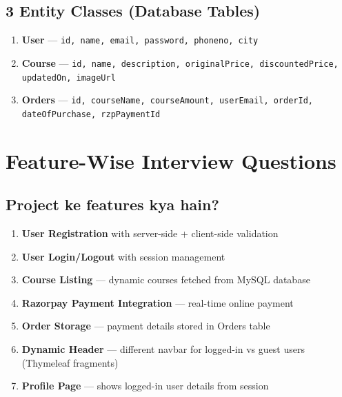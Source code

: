 \documentclass[12pt,a4paper]{article}
\begin{document}
\subsection*{3 Entity Classes (Database Tables)}

\begin{enumerate}
    \item \textbf{User} --- \texttt{id, name, email, password, phoneno, city}
    \item \textbf{Course} --- \texttt{id, name, description, originalPrice, discountedPrice, updatedOn, imageUrl}
    \item \textbf{Orders} --- \texttt{id, courseName, courseAmount, userEmail, orderId, dateOfPurchase, rzpPaymentId}
\end{enumerate}

\section{Feature-Wise Interview Questions}

\setcounter{subsection}{0}

\subsection{Project ke features kya hain?}

\begin{answerbox}
\begin{enumerate}
    \item \textbf{User Registration} with server-side + client-side validation
    \item \textbf{User Login/Logout} with session management
    \item \textbf{Course Listing} --- dynamic courses fetched from MySQL database
    \item \textbf{Razorpay Payment Integration} --- real-time online payment
    \item \textbf{Order Storage} --- payment details stored in Orders table
    \item \textbf{Dynamic Header} --- different navbar for logged-in vs guest users (Thymeleaf fragments)
    \item \textbf{Profile Page} --- shows logged-in user details from session
\end{enumerate}
\end{answerbox}
\end{document}
